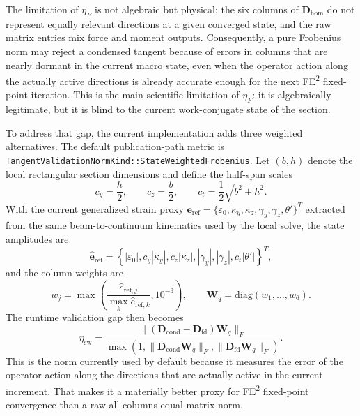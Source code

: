 The limitation of \(\eta_F\) is not algebraic but physical: the six columns of
\(\mathbf{D}_{\mathrm{hom}}\) do not represent equally relevant directions at a
given converged state, and the raw matrix entries mix force and moment outputs.
Consequently, a pure Frobenius norm may reject a condensed tangent because of
errors in columns that are nearly dormant in the current macro state, even when
the operator action along the actually active directions is already accurate
enough for the next FE\textsuperscript{2} fixed-point iteration.  This is the
main scientific limitation of \(\eta_F\): it is algebraically legitimate, but
it is blind to the current work-conjugate state of the section.

To address that gap, the current implementation adds three weighted
alternatives.
The default publication-path metric is
\texttt{TangentValidationNormKind::StateWeightedFrobenius}.  Let
\((b,h)\) denote the local rectangular section dimensions and define the
half-span scales
\begin{equation}
  c_y = \frac{h}{2}, \qquad
  c_z = \frac{b}{2}, \qquad
  c_t = \frac{1}{2}\sqrt{b^2+h^2}.
\end{equation}
With the current generalized strain proxy
\(\mathbf{e}_{\mathrm{ref}} =
\{\varepsilon_0,\kappa_y,\kappa_z,\gamma_y,\gamma_z,\theta'\}^{T}\)
extracted from the same beam-to-continuum kinematics used by the local solve,
the state amplitudes are
\begin{equation}
  \widehat{\mathbf{e}}_{\mathrm{ref}}
  =
  \left\{
    |\varepsilon_0|,
    c_y |\kappa_y|,
    c_z |\kappa_z|,
    |\gamma_y|,
    |\gamma_z|,
    c_t |\theta'|
  \right\}^{T},
  \label{eq:ms-pub-state-weighted-amplitudes}
\end{equation}
and the column weights are
\begin{equation}
  w_j
  =
  \max\!\left(
    \frac{\widehat e_{\mathrm{ref},j}}
         {\max_k \widehat e_{\mathrm{ref},k}},
    10^{-3}
  \right),
  \qquad
  \mathbf{W}_q = \mathrm{diag}(w_1,\dots,w_6).
  \label{eq:ms-pub-state-weighted-columns}
\end{equation}
The runtime validation gap then becomes
\begin{equation}
  \eta_{\mathrm{sw}}
  =
  \frac{\lVert
      (\mathbf{D}_{\mathrm{cond}}-\mathbf{D}_{\mathrm{fd}})\mathbf{W}_q
    \rVert_F}
       {\max\!\left(
          1,
          \lVert \mathbf{D}_{\mathrm{cond}}\mathbf{W}_q \rVert_F,
          \lVert \mathbf{D}_{\mathrm{fd}}\mathbf{W}_q \rVert_F
       \right)}.
  \label{eq:ms-pub-state-weighted-gap}
\end{equation}
This is the norm currently used by default because it measures the error of the
operator action along the directions that are actually active in the current
increment.  That makes it a materially better proxy for FE\textsuperscript{2}
fixed-point convergence than a raw all-columns-equal matrix norm.

